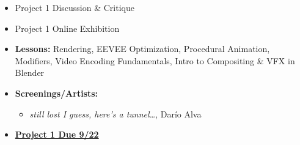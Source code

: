 \def\tues{9/22}%
\def\thur{9/24}%
% 
\begin{itemize}[noitemsep,topsep=0pt,leftmargin=*]
    \item Project 1 Discussion \& Critique
    \item Project 1 Online Exhibition
\end{itemize}
\vspace{1em}
\begin{itemize}[noitemsep,topsep=0pt,leftmargin=*]
    \item \textbf{Lessons:} Rendering, EEVEE Optimization, Procedural Animation, Modifiers, Video Encoding Fundamentals, Intro to Compositing \& VFX in Blender
    \item \textbf{Screenings/Artists:}
    \begin{itemize}
        \item \emph{still lost I guess, here’s a tunnel\dots}, Darío Alva
        \end{itemize}
    \item \textcolor{defaultColor}{\ul{\textbf{Project 1 Due \tues}}}
\end{itemize}